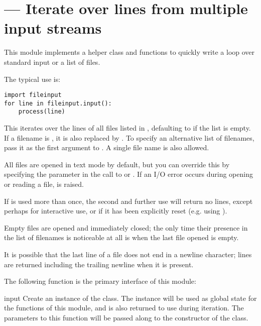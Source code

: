 \section{ ---
         Iterate over lines from multiple input streams}



This module implements a helper class and functions to quickly write a
loop over standard input or a list of files.

The typical use is:

\begin{verbatim}
import fileinput
for line in fileinput.input():
    process(line)
\end{verbatim}

This iterates over the lines of all files listed in
, defaulting to  if the list is
empty.  If a filename is , it is also replaced by
.  To specify an alternative list of filenames, pass
it as the first argument to .  A single file name is
also allowed.

All files are opened in text mode by default, but you can override this by
specifying the  parameter in the call to 
or .  If an I/O error occurs during opening or reading
a file,  is raised.

If  is used more than once, the second and further use
will return no lines, except perhaps for interactive use, or if it has
been explicitly reset (e.g. using ).

Empty files are opened and immediately closed; the only time their
presence in the list of filenames is noticeable at all is when the
last file opened is empty.

It is possible that the last line of a file does not end in a newline
character; lines are returned including the trailing newline when it
is present.

The following function is the primary interface of this module:

\begin{funcdesc}{input}{}
  Create an instance of the  class.  The instance
  will be used as global state for the functions of this module, and
  is also returned to use during iteration.  The parameters to this
  function will be passed along to the constructor of the
   class.

\end{funcdesc}


